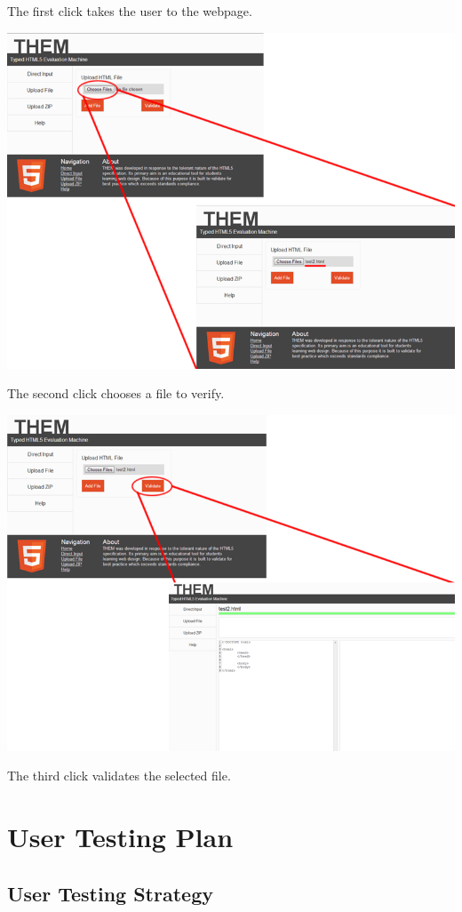 \documentclass[10pt]{article}
\begin{document}
The first click takes the user to the webpage.

\includegraphics[scale=0.4]{click2.png}

The second click chooses a file to verify.

\includegraphics[scale=0.4]{click3.png}

The third click validates the selected file.

\newpage

\section*{User Testing Plan}

\subsection*{User Testing Strategy}
\end{document}
